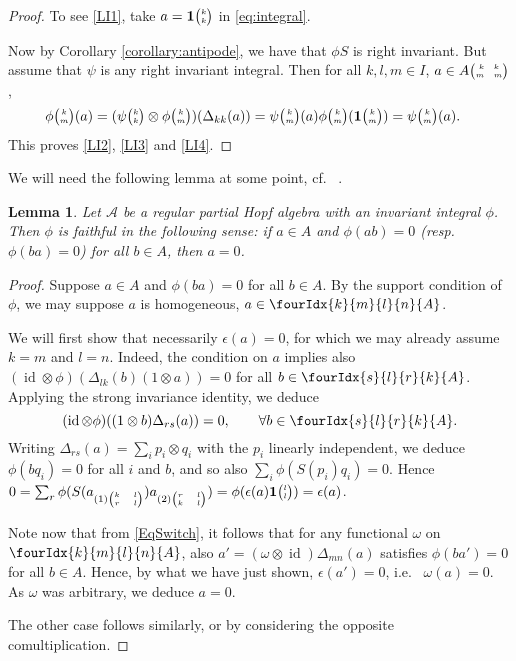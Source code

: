 \documentclass[10pt]{article}
\DeclareMathOperator{\id}{id}
\newcommand{\Grt}[3]{#1{\tiny{\begin{pmatrix} #2\\#3\end{pmatrix}}}}
\newcommand{\UnitC}[2]{\Grt{\mathbf{1}}{#1}{#2}}
\newcommand{\pmat}[4]{{\tiny \begin{pmatrix} #1 \quad #2 \\ #3 \quad #4\end{pmatrix}}}
\newcommand{\Gr}[5]{\fourIdx{#2}{#4}{#3}{#5}{#1}}%
\newtheorem{Lem}[Theorem]{Lemma}
\theoremstyle{definition}
\newcommand{\phic}[2]{\Grt{\phi}{#1}{#2}}
\numberwithin{equation}{section}
\begin{document}
\begin{proof} 
To see \ref{LI1}, take $a=\UnitC{k}{k}$ in \eqref{eq:integral}. 

Now by Corollary \ref{corollary:antipode}, we have that $\phi S$ is right invariant. But assume that $\psi$ is any
 right invariant integral.     Then for all $k,l,m\in I$, $a\in A\pmat{k}{k}{m}{m}$,
    \begin{align*}
      \phic{k}{m}(a)  &= (\Grt{\psi}{k}{k} \otimes
      \phic{k}{m})(\Delta_{kk}(a)) = \Grt{\psi}{k}{m}(a)\Grt{\phi}{k}{m}(\UnitC{k}{m}) = \Grt{\psi}{k}{m}(a) .
    \end{align*}
  This proves \ref{LI2}, \ref{LI3} and \ref{LI4}.  
     \end{proof} 


We will need the following lemma at some point, cf.~ \cite[Proposition 3.4]{VDae2}.

\begin{Lem}\label{LemFaith} Let $\mathscr{A}$ be a regular partial Hopf
  algebra with an invariant integral $\phi$. Then
  $\phi$ is faithful in the following sense: if $a\in A$ and
  $\phi(ab) =0$ (resp. $\phi(ba)=0$) for all $b\in A$, then
  $a=0$.
\end{Lem} 

\begin{proof} Suppose $a\in A$ and $\phi(ba)=0$ for all $b\in A$. By the support condition of $\phi$, we may suppose $a$ is homogeneous, $a\in \Gr{A}{k}{l}{m}{n}$.

We will first show that necessarily $\epsilon(a)=0$, for which we may already assume $k=m$ and $l=n$. Indeed, the condition on $a$ implies also $(\id\otimes \phi)(\Delta_{lk}(b)(1\otimes a))=0$ for all $b\in \Gr{A}{s}{r}{l}{k}$. Applying the strong invariance identity, we deduce \begin{equation}\label{EqSwitch}(\id\otimes \phi)((1\otimes b)\Delta_{rs}(a))=0,\qquad \forall b\in \Gr{A}{s}{r}{l}{k}.\end{equation} Writing $\Delta_{rs}(a) = \sum_i p_i\otimes q_i$ with the $p_i$ linearly independent, we deduce $\phi(bq_i)=0$ for all $i$ and $b$, and so also $\sum_i \phi(S(p_i)q_i)=0$. Hence $0=\sum_r \phi(S(a_{(1){\tiny \begin{pmatrix} k & l \\ r & l \end{pmatrix}}})a_{(2){\tiny \begin{pmatrix} r & l \\ k & l\end{pmatrix}}}) = \phi(\epsilon(a) \UnitC{l}{l}) = \epsilon(a)$.

Note now that from \eqref{EqSwitch}, it follows that for any functional $\omega$ on $\Gr{A}{k}{l}{m}{n}$, also $a'=(\omega\otimes \id)\Delta_{mn}(a)$ satisfies $\phi(ba')=0$ for all $b\in A$. Hence, by what we have just shown, $\epsilon(a')=0$, i.e.~ $\omega(a)=0$. As $\omega$ was arbitrary, we deduce $a=0$.

The other case follows similarly, or by considering the opposite comultiplication.
\end{proof} 
\end{document}
